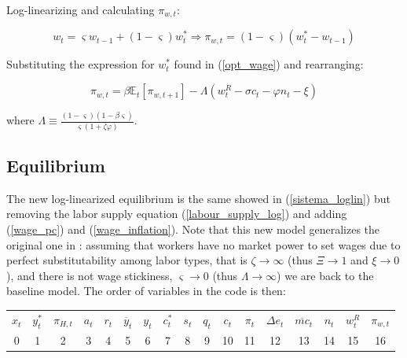 \documentclass{article}
\newcommand{\Et}{\mathbb{E}_t}
\begin{document}
\vspace{6pt}

\begin{minipage}{0.4\textwidth}
    Log-linearizing and calculating $\pi_{w,t}$:
\end{minipage} 
\begin{minipage}{0.59\textwidth}
    \begin{equation}
        w_t = \varsigma w_{t-1} + (1-\varsigma) w_t^* \Rightarrow \pi_{w,t} = (1-\varsigma)(w_t^* - w_{t-1})
    \end{equation}
\end{minipage} 

\vspace{6pt}

Substituting the expression for $w_t^*$ found in (\ref{opt_wage}) and rearranging:

\begin{equation}
    \label{wage_pc}
    \pi_{w,t} = \beta \Et[\pi_{w,t+1}] - \Lambda (w_t^R  - \sigma c_t - \varphi n_t - \xi)
\end{equation}

where $\Lambda \equiv \frac{(1-\varsigma)(1- \beta \varsigma)}{\varsigma(1+ \zeta \varphi)}$.

\subsection{Equilibrium}
The new log-linearized equilibrium is the same showed in (\ref{sistema_loglin}) but removing the labor supply equation (\ref{labour_supply_log}) and adding (\ref{wage_pc}) and (\ref{wage_inflation}). Note that this new model generalizes the original one in \cite{gali_monacelli}: assuming that workers have no market power to set wages due to perfect substitutability among labor types, that is $\zeta \to \infty$ (thus $\Xi \to 1$ and $\xi \to 0$), and there is not wage stickiness, $\varsigma \to 0$ (thus $\Lambda \to \infty$) we are back to the baseline model. The order of variables in the code is then:

\begin{table}[H]
    \centering
    \begin{tabular}{ccccccccccccccccc}
        \hline
        $x_t$ & $y_t^*$ & $\pi_{H,t}$ & $a_t$ & $r_t$ & $\overline{y}_t$ & $y_t$ & $c_t^*$ & $s_t$ & $q_t$ & $c_t$ & $\pi_t$ & $\Delta e_t$ & $\overline{mc}_t$ & $n_t$ & $w_t^R$ & $\pi_{w,t}$\\
        0 & 1 & 2 & 3 & 4 & 5 & 6 & 7 & 8 & 9 & 10 & 11 & 12 & 13 & 14 & 15 & 16 \\
        \hline
    \end{tabular}
\end{table}
\end{document}

